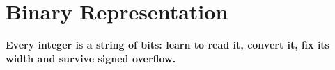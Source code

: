 \chapter{Binary Representation}
\label{ch:introduction}

\begin{tcolorbox}[enhanced, colback=white, colframe=secondaryblue, boxrule=1pt, arc=2mm]
\textbf{\large\textcolor{primaryblue}{Every integer is a string of bits: learn to read it, convert it, fix its width and survive signed overflow.}}
\end{tcolorbox}


